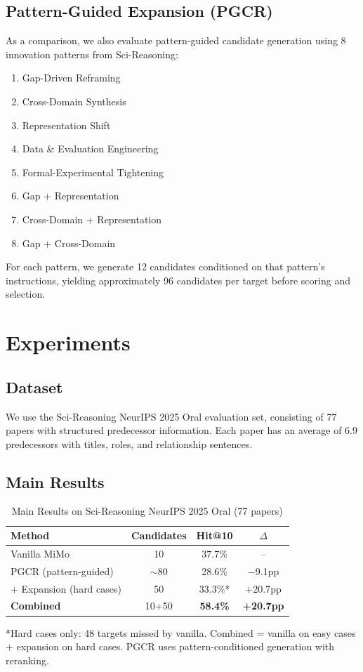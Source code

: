 \documentclass[conference]{IEEEtran}
\begin{document}
\subsection{Pattern-Guided Expansion (PGCR)}

As a comparison, we also evaluate pattern-guided candidate generation using 8 innovation patterns from Sci-Reasoning:
\begin{enumerate}
    \item Gap-Driven Reframing
    \item Cross-Domain Synthesis
    \item Representation Shift
    \item Data \& Evaluation Engineering
    \item Formal-Experimental Tightening
    \item Gap + Representation
    \item Cross-Domain + Representation
    \item Gap + Cross-Domain
\end{enumerate}

For each pattern, we generate 12 candidates conditioned on that pattern's instructions, yielding approximately 96 candidates per target before scoring and selection.

\section{Experiments}

\subsection{Dataset}

We use the Sci-Reasoning NeurIPS 2025 Oral evaluation set, consisting of 77 papers with structured predecessor information. Each paper has an average of 6.9 predecessors with titles, roles, and relationship sentences.

\subsection{Main Results}

\begin{table}[htbp]
\caption{Main Results on Sci-Reasoning NeurIPS 2025 Oral (77 papers)}
\label{tab:main}
\begin{center}
\begin{tabular}{lccc}
\toprule
Method & Candidates & Hit@10 & $\Delta$ \\
\midrule
Vanilla MiMo & 10 & 37.7\% & -- \\
PGCR (pattern-guided) & $\sim$80 & 28.6\% & $-$9.1pp \\
+ Expansion (hard cases) & 50 & 33.3\%* & +20.7pp \\
\textbf{Combined} & 10+50 & \textbf{58.4\%} & \textbf{+20.7pp} \\
\bottomrule
\end{tabular}
\end{center}
\footnotesize{*Hard cases only: 48 targets missed by vanilla. Combined = vanilla on easy cases + expansion on hard cases. PGCR uses pattern-conditioned generation with reranking.}
\end{table}
\end{document}
